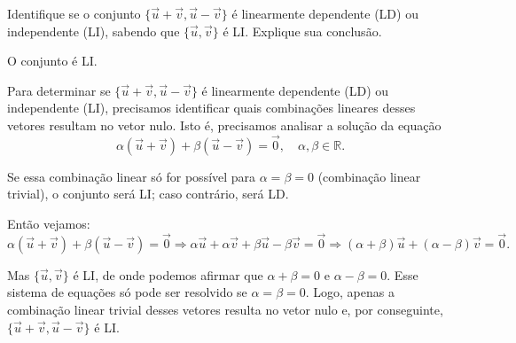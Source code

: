 
\begin{question}
	Identifique se o conjunto $\{\vec u + \vec v, \vec u - \vec v\}$ é linearmente dependente (LD) ou independente (LI), sabendo que $\{\vec u, \vec v\}$ é LI.
	Explique sua conclusão.

	\begin{answer}
		O conjunto é LI.
	\end{answer}

	\begin{solution}
		Para determinar se $\{\vec u + \vec v, \vec u - \vec v\}$ é linearmente dependente (LD) ou independente (LI), precisamos identificar quais combinações lineares desses vetores resultam no vetor nulo.
		Isto é, precisamos analisar a solução da equação
		\begin{equation*}
			\alpha \left(\vec u + \vec v\right) + \beta \left(\vec u - \vec v\right) = \vec 0,
			\quad \alpha, \beta \in \mathbb{R}.
		\end{equation*}

		Se essa combinação linear só for possível para $\alpha = \beta = 0$ (combinação linear trivial), o conjunto será LI; caso contrário, será LD.

		Então vejamos:
		\begin{equation*}
			\alpha (\vec u + \vec v) + \beta (\vec u - \vec v) = \vec 0 \Rightarrow
			\alpha\vec u + \alpha\vec v + \beta\vec u - \beta\vec v = \vec 0 \Rightarrow
			(\alpha+\beta)\vec u + (\alpha-\beta)\vec v = \vec 0.
		\end{equation*}

		Mas $\{\vec u,\vec v\}$ é LI, de onde podemos afirmar que $\alpha + \beta = 0$ e $\alpha - \beta = 0$.
		Esse sistema de equações só pode ser resolvido se $\alpha = \beta = 0$.
		Logo, apenas a combinação linear trivial desses vetores resulta no vetor nulo e, por conseguinte, $\{\vec u + \vec v, \vec u - \vec v\}$ é LI.
	\end{solution}
\end{question}

